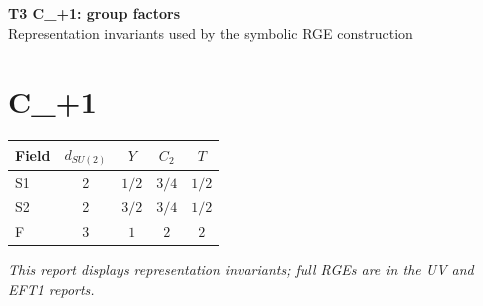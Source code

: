 \documentclass[10pt,a4paper]{article}
\begin{document}
\begin{center}
{\Large\bfseries T3 C\_+1: group factors}\\[4pt]
Representation invariants used by the symbolic RGE construction
\end{center}
\bigskip
\section*{C\_+1}
\begin{longtable}{@{}lcccc@{}}
\toprule Field & $d_{SU(2)}$ & $Y$ & $C_2$ & $T$ \\
\midrule
S1 & 2 & $1/2$ & $3/4$ & $1/2$ \\
S2 & 2 & $3/2$ & $3/4$ & $1/2$ \\
F & 3 & $1$ & $2$ & $2$ \\
\bottomrule
\end{longtable}
\emph{This report displays representation invariants; full RGEs are in the UV and EFT1 reports.}
\end{document}
